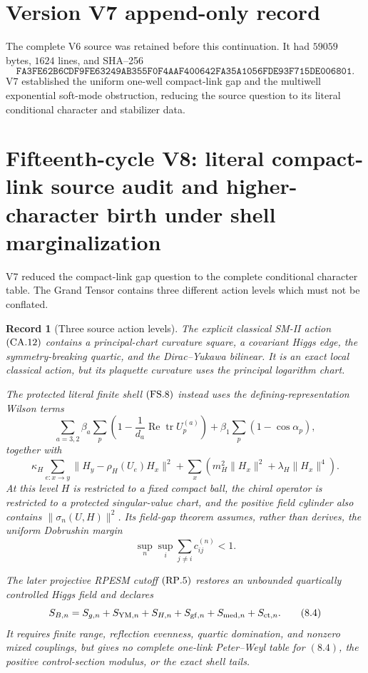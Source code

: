 \documentclass[11pt]{article}
\newtheorem{record}[theorem]{Record}
\theoremstyle{remark}
\begin{document}
\section*{Version V7 append-only record}
The complete V6 source was retained before this continuation.  It
had \(59059\) bytes, \(1624\) lines, and SHA--256
\[
 \texttt{FA3FE62B6CDF9FE63249AB355F0F4AAF400642FA35A1056FDE93F715DE006801}.
\]
V7 established the uniform one-well compact-link gap and the
multiwell exponential soft-mode obstruction, reducing the source
question to its literal conditional character and stabilizer data.




\section{Fifteenth-cycle V8: literal compact-link source audit and higher-character birth under shell marginalization}
\label{sec:v15v8}

V7 reduced the compact-link gap question to the complete
conditional character table.  The Grand Tensor contains three
different action levels which must not be conflated.

\begin{record}[Three source action levels]
\label{rec:v15v8-action-levels}
The explicit classical SM-II action \({\rm(CA.12)}\) contains a
principal-chart curvature square, a covariant Higgs edge,
the symmetry-breaking quartic, and the Dirac--Yukawa bilinear.
It is an exact local classical action, but its plaquette curvature
uses the principal logarithm chart.

The protected literal finite shell \({\rm(FS.8)}\) instead uses
the defining-representation Wilson terms
\[
 \sum_{a=3,2}\beta_a\sum_p
 \left(1-\frac1{d_a}\operatorname{Re}\operatorname{tr}U_p^{(a)}\right)
 +\beta_1\sum_p(1-\cos\alpha_p),                             \tag{8.1}
\]
together with
\[
 \kappa_H\sum_{e:x\to y}
 \|H_y-\rho_H(U_e)H_x\|^2
 +\sum_x(m_H^2\|H_x\|^2+\lambda_H\|H_x\|^4).                \tag{8.2}
\]
At this level \(H\) is restricted to a fixed compact ball, the
chiral operator is restricted to a protected singular-value chart,
and the positive field cylinder also contains
\(\|\sigma_n(U,H)\|^2\).  Its field-gap theorem assumes, rather
than derives, the uniform Dobrushin margin
\[
 \sup_n\sup_i\sum_{j\ne i}c_{ij}^{(n)}<1.                    \tag{8.3}
\]

The later projective RPESM cutoff \({\rm(RP.5)}\) restores an
unbounded quartically controlled Higgs field and declares
\[
 S_{B,n}=S_{g,n}+S_{{\rm YM},n}+S_{H,n}
          +S_{{\rm gf},n}+S_{{\rm med},n}+S_{{\rm ct},n}.     \tag{8.4}
\]
It requires finite range, reflection evenness, quartic domination,
and nonzero mixed couplings, but gives no complete one-link
Peter--Weyl table for \((8.4)\), the positive control-section
modulus, or the exact shell tails.
\end{record}
\end{document}
